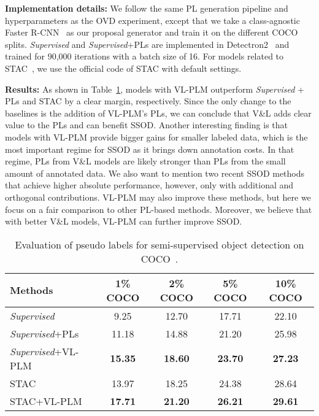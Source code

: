 \documentclass[runningheads]{llncs}
\begin{document}
\vspace{1mm}
\noindent \textbf{Implementation details:} 
We follow the same PL generation pipeline and hyperparameters as the OVD experiment, except that we take a class-agnostic Faster R-CNN~\cite{ren_neurips15_fasterrcnn} as our proposal generator and train it on the different COCO splits.
\emph{Supervised} and \emph{Supervised}+PLs are implemented in Detectron2~\cite{wu2019detectron2} and trained for 90,000 iterations with a batch size of 16.
For models related to STAC~\cite{sohn2020detection}, we use the official code of STAC with default settings. 

\vspace{1mm}
\noindent \textbf{Results:} As shown in Table~\ref{table:ssl_results}, models with VL-PLM outperform \emph{Supervised} + PLs and STAC by a clear margin, respectively.
Since the only change to the baselines is the addition of VL-PLM's PLs, we can conclude that V\&L adds clear value to the PLs and can benefit SSOD.
Another interesting finding is that models with VL-PLM provide bigger gains for smaller labeled data, which is the most important regime for SSOD as it brings down annotation costs.
In that regime, PLs from V\&L models are likely stronger than PLs from the small amount of annotated data.
We also want to mention two recent SSOD methods~\cite{xu_iccv2021_softteacher,zhou_cvpr_21} that achieve higher absolute performance, however, only with additional and orthogonal contributions.  VL-PLM may also improve these methods, but here we focus on a fair comparison to other PL-based methods. Moreover, we believe that with better V\&L models, VL-PLM can further improve SSOD.


\begin{table}[tb]
\begin{center}
\caption{Evaluation of pseudo labels for semi-supervised object detection on COCO~\cite{COCO}. 
}
\label{table:ssl_results}
\begin{tabular}{l c c c c}
\toprule
Methods & 1\% COCO & 2\% COCO & 5\% COCO & 10\% COCO\\
\hline
\emph{Supervised} & 9.25 & 12.70 & 17.71 & 22.10 \\
\emph{Supervised}+PLs & 11.18 & 14.88 & 21.20 & 25.98 \\
\emph{Supervised}+VL-PLM & \bf{15.35} & \bf{18.60} & \bf{23.70} & \bf{27.23} \\
\hline
STAC \cite{sohn2020detection} & 13.97 & 18.25 & 24.38 & 28.64 \\
STAC+VL-PLM & {\bf 17.71} & \bf{21.20} & {\bf 26.21} & {\bf 29.61} \\
\bottomrule
\end{tabular}
\end{center}
\end{table}
\end{document}
